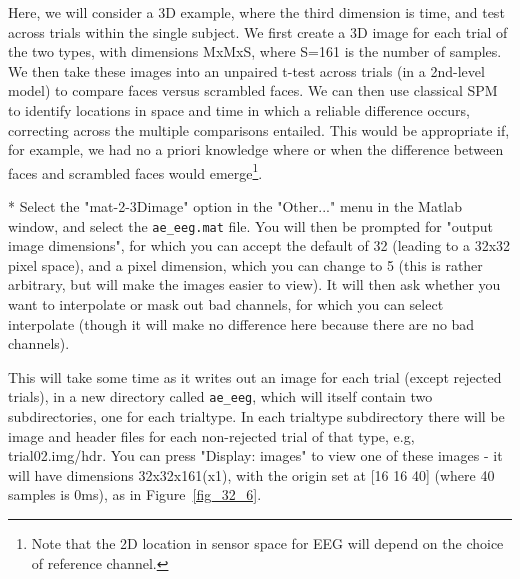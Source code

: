Here, we will consider a 3D example, where the third dimension is time, and test across trials within the single subject. We first create a 3D image for each trial of the two types, with dimensions MxMxS, where S=161 is the number of samples. We then take these images into an unpaired t-test across trials (in a 2nd-level model) to compare faces versus scrambled faces. We can then use classical SPM to identify locations in space and time in which a reliable difference occurs, correcting across the multiple comparisons entailed. This would be appropriate if, for example, we had no a priori knowledge where or when the difference between faces and scrambled faces would emerge\footnote{Note that the 2D location in sensor space for EEG will depend on the choice of reference channel.}.

* Select the "mat-2-3Dimage" option in the "Other..." menu in the Matlab window, and select the \verb!ae_eeg.mat! file. You will then be prompted for "output image dimensions", for which you can accept the default of 32 (leading to a 32x32 pixel space), and a pixel dimension, which you can change to 5 (this is rather arbitrary, but will make the images easier to view). It will then ask whether you want to interpolate or mask out bad channels, for which you can select interpolate (though it will make no difference here because there are no bad channels).

This will take some time as it writes out an image for each trial (except rejected trials), in a new directory called \verb!ae_eeg!, which will itself contain two subdirectories, one for each trialtype. In each trialtype subdirectory there will be image and header files for each non-rejected trial of that type, e.g, trial02.img/hdr. You can press "Display: images" to view one of these images - it will have dimensions 32x32x161(x1), with the origin set at [16  16  40] (where 40 samples is 0ms), as in Figure~\ref{fig_32_6}.



